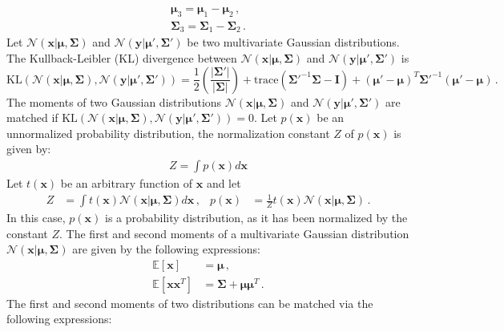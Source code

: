 \begin{align}
\boldsymbol{\mu}_3 = \boldsymbol{\mu}_1 - \boldsymbol{\mu}_2\,, \\
\boldsymbol{\Sigma}_3 = \boldsymbol{\Sigma}_1 - \boldsymbol{\Sigma}_2 \,.
\end{align}
Let $\mathcal{N}(\mathbf{x}|\bm{\mu},\bm{\Sigma})$
and $\mathcal{N}(\mathbf{y}|\bm{\mu}',\bm{\Sigma}')$ be two multivariate Gaussian distributions. The Kullback-Leibler (KL) divergence between $\mathcal{N}(\mathbf{x}|\bm{\mu},\bm{\Sigma})$ and $\mathcal{N}(\mathbf{y}|\bm{\mu}',\bm{\Sigma}')$ is
\begin{equation}
\text{KL}\left(\mathcal{N}(\mathbf{x}|\bm{\mu},\bm{\Sigma}),\mathcal{N}(\mathbf{y}|\bm{\mu}',\bm{\Sigma}')\right)  = \frac{1}{2} \left( \frac{|\bm{\Sigma}'|}{|\bm{\Sigma}|} \right) + 
\text{trace} \left( \bm{\Sigma}'^{-1} \bm{\Sigma} - \mathbf{I} \right) + 
(\bm{\mu}'-\bm{\mu})^T \bm{\Sigma}'^{-1} (\bm{\mu}'-\bm{\mu})\,. \label{eq:Appendix_KL_Gaussian}
\end{equation}
The moments of two Gaussian distributions $\mathcal{N}(\mathbf{x}|\bm{\mu},\bm{\Sigma})$ and $\mathcal{N}(\mathbf{y}|\bm{\mu}',\bm{\Sigma}')$ are matched if $\text{KL}\left(\mathcal{N}(\mathbf{x}|\bm{\mu},\bm{\Sigma}),\mathcal{N}(\mathbf{y}|\bm{\mu}',\bm{\Sigma}')\right) = 0$. Let $p(\mathbf{x})$ be an unnormalized probability distribution, the normalization constant $Z$ of $p(\mathbf{x})$ is given by: 
\begin{align}
Z = \int p(\mathbf{x}) d\mathbf{x}
\end{align}
Let $t(\mathbf{x})$ be an arbitrary function of $\mathbf{x}$ and let
\begin{align}
Z & = \int t(\mathbf{x}) \mathcal{N}(\mathbf{x}|\bm{\mu},\bm{\Sigma}) d \mathbf{x}\,, &
p(\mathbf{x}) & = \frac{1}{Z} t(\mathbf{x}) \mathcal{N}(\mathbf{x}|\bm{\mu},\bm{\Sigma})\,.
\label{eq:Z_exp}
\end{align}
In this case, $p(\mathbf{x})$ is a probability distribution, as it has been normalized by the constant $Z$. The first and second moments of a multivariate Gaussian distribution $\mathcal{N}(\mathbf{x}|\bm{\mu}, \bm{\Sigma})$ are given by the following expressions:
\begin{align}
\mathbb{E}[\mathbf{x}] & = \boldsymbol{\mu}\,,\\
\mathbb{E}[\mathbf{x}\mathbf{x}^T] & = \boldsymbol{\Sigma} + \boldsymbol{\mu}\boldsymbol{\mu}^T\,.
\end{align}
The first and second moments of two distributions can be matched via the following expressions: 

